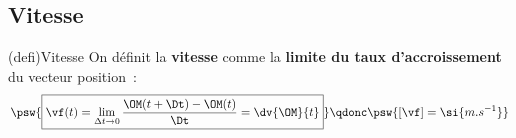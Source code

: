 \documentclass[../../main/main.tex]{subfiles}
\begin{document}
\subsection{Vitesse}
\begin{tcb}[sidebyside, righthand ratio=.25](defi){Vitesse}
	On définit la \textbf{vitesse} comme la \textbf{limite du taux
		d'accroissement} du vecteur position~:
	\[
		\psw{%
			\boxed{%
				\vf(t) =
				\lim_{\Delta{t}\to 0} \frac{\OM(t+\Dt) - \OM(t)}{\Dt} =
				\dv{\OM}{t}
			}%
		}%
		\qdonc
		\psw{[\vf] = \si{m.s^{-1}}}
	\]
	\tcblower
	\begin{center}
\end{center}
\end{tcb}
\end{document}
